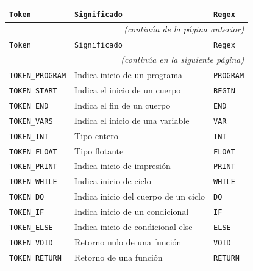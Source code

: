 \documentclass[12pt, letterpaper]{article}
\theoremstyle{definition}
\newcommand{\rx}[1]{\texttt{\textcolor{blue!70!black}{#1}}}
\begin{document}
\begin{center}
\begin{longtable}{|p{3.5cm}|p{5.5cm}|p{5cm}|}
    \hline
    \texttt{Token} & \texttt{Significado} & \texttt{Regex} \\
    \hline
    \endfirsthead

    \multicolumn{3}{r}{\small\textit{(continúa de la página anterior)}} \\
    \hline
    \texttt{Token} & \texttt{Significado} & \texttt{Regex} \\
    \hline
    \endhead

    \hline
    \multicolumn{3}{r}{\small\textit{(continúa en la siguiente página)}} \\
    \endfoot

    \hline
    \endlastfoot

    \texttt{TOKEN\_PROGRAM}    & Indica inicio de un programa         & \rx{PROGRAM} \\ \hline
    \texttt{TOKEN\_START}      & Indica el inicio de un cuerpo        & \rx{BEGIN}    \\ \hline
    \texttt{TOKEN\_END}        & Indica el fin de un cuerpo           & \rx{END}      \\ \hline
    \texttt{TOKEN\_VARS}       & Indica el inicio de una variable     & \rx{VAR}      \\ \hline
    \texttt{TOKEN\_INT}        & Tipo entero                          & \rx{INT}      \\ \hline
    \texttt{TOKEN\_FLOAT}      & Tipo flotante                        & \rx{FLOAT}    \\ \hline
    \texttt{TOKEN\_PRINT}      & Indica inicio de impresión           & \rx{PRINT}    \\ \hline
    \texttt{TOKEN\_WHILE}      & Indica inicio de ciclo               & \rx{WHILE}    \\ \hline
    \texttt{TOKEN\_DO}         & Indica inicio del cuerpo de un ciclo & \rx{DO}       \\ \hline
    \texttt{TOKEN\_IF}         & Indica inicio de un condicional      & \rx{IF}       \\ \hline
    \texttt{TOKEN\_ELSE}       & Indica inicio de condicional else    & \rx{ELSE}     \\ \hline
    \texttt{TOKEN\_VOID}       & Retorno nulo de una función          & \rx{VOID}     \\ \hline
    \texttt{TOKEN\_RETURN}     & Retorno de una función               & \rx{RETURN}   \\ \hline


\end{longtable}
\end{center}
\end{document}
